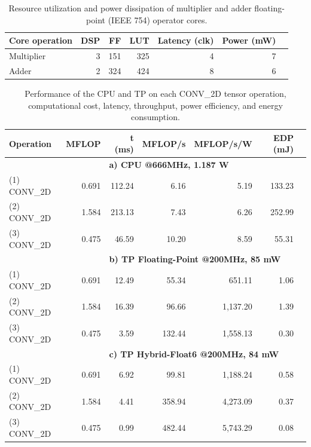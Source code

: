 \begin{table}[!h]\centering
	\caption{Resource utilization and power dissipation of multiplier and adder floating-point (IEEE 754) operator cores.}\label{tab:LogiCORE}
	\scriptsize
	\begin{tabular}{lrrrrrr}\toprule
		\textbf{Core operation} &\textbf{DSP} &\textbf{FF} &\textbf{LUT} &\textbf{Latency (clk)} &\textbf{Power (mW)} \\\midrule
		Multiplier &3 &151 &325 &4 &7 \\
		Adder &2 &324 &424 &8 &6 \\
		\bottomrule
	\end{tabular}
\end{table}


\begin{table}[!htp]\centering
	\caption{Performance of the CPU and TP on each CONV\_2D tensor operation, computational cost, latency, throughput, power efficiency, and energy consumption.}\label{tab:performance}
	\scriptsize
	\begin{tabular}{lrrrrrr}\toprule
		\textbf{Operation} &\textbf{MFLOP} &\textbf{t (ms)} &\textbf{MFLOP/s} &\textbf{MFLOP/s/W} &\textbf{EDP (mJ)} \\\midrule
		& &\multicolumn{4}{l}{\textbf{a) CPU @666MHz, 1.187 W}} \\
		(1) CONV\_2D &0.691 &112.24 &6.16 &5.19 &133.23 \\
		(2) CONV\_2D &1.584 &213.13 &7.43 &6.26 &252.99 \\
		(3) CONV\_2D &0.475 &46.59 &10.20 &8.59 &55.31 \\
		& &\multicolumn{4}{l}{\textbf{b) TP Floating-Point @200MHz, 85 mW}} \\
		(1) CONV\_2D &0.691 &12.49 &55.34 &651.11 &1.06 \\
		(2) CONV\_2D &1.584 &16.39 &96.66 &1,137.20 &1.39 \\
		(3) CONV\_2D &0.475 &3.59 &132.44 &1,558.13 &0.30 \\
		& &\multicolumn{4}{l}{\textbf{c) TP Hybrid-Float6 @200MHz, 84 mW}} \\
		(1) CONV\_2D &0.691 &6.92 &99.81 &1,188.24 &0.58 \\
		(2) CONV\_2D &1.584 &4.41 &358.94 &4,273.09 &0.37 \\
		(3) CONV\_2D &0.475 &0.99 &482.44 &5,743.29 &0.08 \\
		\bottomrule
	\end{tabular}
\end{table}


